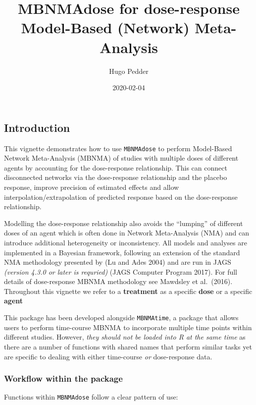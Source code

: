 \documentclass[]{article}
\title{MBNMAdose for dose-response Model-Based (Network) Meta-Analysis}
\author{Hugo Pedder}
\date{2020-02-04}
\begin{document}
\maketitle

{
\setcounter{tocdepth}{2}
\tableofcontents
}
\hypertarget{introduction}{%
\subsection{Introduction}\label{introduction}}

This vignette demonstrates how to use \texttt{MBNMAdose} to perform
Model-Based Network Meta-Analysis (MBNMA) of studies with multiple doses
of different agents by accounting for the dose-response relationship.
This can connect disconnected networks via the dose-response
relationship and the placebo response, improve precision of estimated
effects and allow interpolation/extrapolation of predicted response
based on the dose-response relationship.

Modelling the dose-response relationship also avoids the ``lumping'' of
different doses of an agent which is often done in Network Meta-Analysis
(NMA) and can introduce additional heterogeneity or inconsistency. All
models and analyses are implemented in a Bayesian framework, following
an extension of the standard NMA methodology presented by (Lu and Ades
2004) and are run in JAGS \emph{(version 4.3.0 or later is requried)}
(JAGS Computer Program 2017). For full details of dose-response MBNMA
methodology see Mawdsley et al.~(2016). Throughout this vignette we
refer to a \textbf{treatment} as a specific \textbf{dose} or a specific
\textbf{agent}

This package has been developed alongside \texttt{MBNMAtime}, a package
that allows users to perform time-course MBNMA to incorporate multiple
time points within different studies. However, \emph{they should not be
loaded into R at the same time} as there are a number of functions with
shared names that perform similar tasks yet are specific to dealing with
either time-course \emph{or} dose-response data.

\hypertarget{workflow-within-the-package}{%
\subsubsection{Workflow within the
package}\label{workflow-within-the-package}}

Functions within \texttt{MBNMAdose} follow a clear pattern of use:
\end{document}
